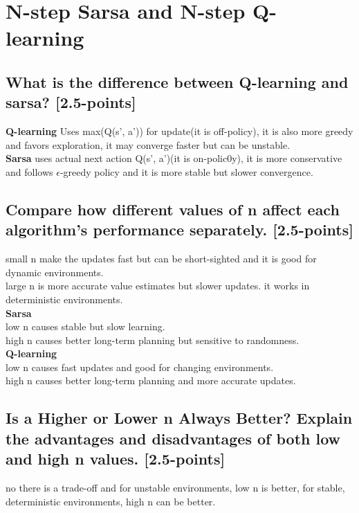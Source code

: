 \documentclass[12pt]{article}
\begin{document}
{{{				\section{N-step Sarsa and N-step Q-learning}
				\subsection{What is the difference between Q-learning and sarsa? [2.5-points]}
				\textbf{Q-learning} Uses max(Q(s', a')) for update(it is off-policy), it is also more greedy and favors exploration, it may converge faster but can be unstable.\\
				\textbf{Sarsa} uses actual next action Q(s', a')(it is on-polic0y), it is more conservative and follows $\epsilon$-greedy policy and it is more stable but slower convergence.
				\subsection{Compare how different values of n affect each algorithm's performance separately. [2.5-points]}
				small n make the updates fast but can be short-sighted and it is good for dynamic environments.\\
				large n is more accurate value estimates but slower updates.
				it works in deterministic environments.\\
				\textbf{Sarsa}\\
				low n causes stable but slow learning.\\
				high n causes better long-term planning but sensitive to randomness.\\
				\textbf{Q-learning}\\
				low n causes fast updates and good for changing environments.\\
				high n causes better long-term planning and more accurate updates.
				
				\subsection{Is a Higher or Lower n Always Better? Explain the advantages and disadvantages of both low and high n values. [2.5-points]}
				no there is a trade-off and for unstable environments, low n is better, for stable, deterministic environments, high n can be better.
		}}
		
		
		\newpage
		
		{\selectfont {\color{DarkBlue}
				
}}}
\end{document}
